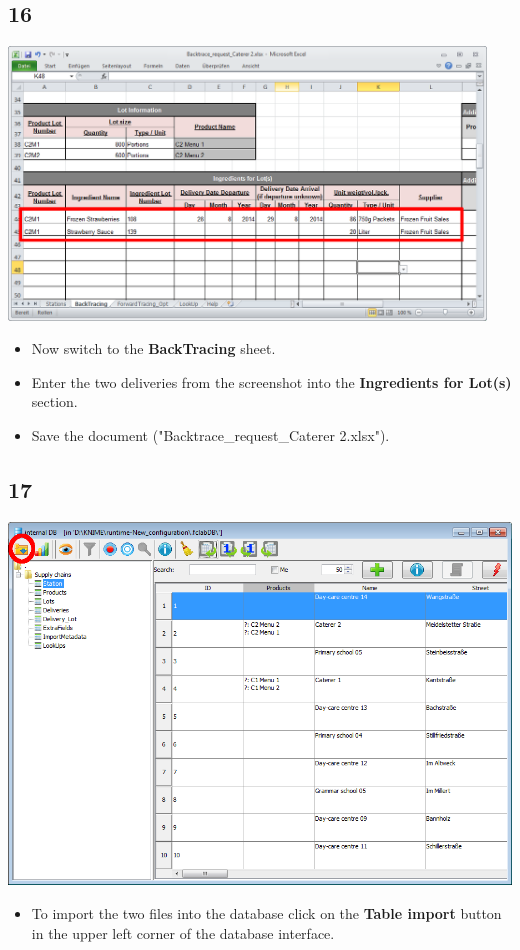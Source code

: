 \documentclass{beamer}
\begin{document}
\subsection{16}
\begin{frame}
	\begin{center}
  		\includegraphics[width=0.95\textwidth]{16.png}
	\end{center}
	\begin{itemize}
		\item Now switch to the \textbf{BackTracing} sheet.
		\item Enter the two deliveries from the screenshot into the \textbf{Ingredients for Lot(s)} section.
		\item Save the document ("Backtrace\_request\_Caterer 2.xlsx").
	\end{itemize}
\end{frame}

\subsection{17}
\begin{frame}
	\begin{center}
  		\includegraphics[height=0.6\textheight]{17.png}
	\end{center}
	\begin{itemize}
		\item To import the two files into the database click on the \textbf{Table import} button in the upper left corner of the database interface.
	\end{itemize}
\end{frame}
\end{document}
